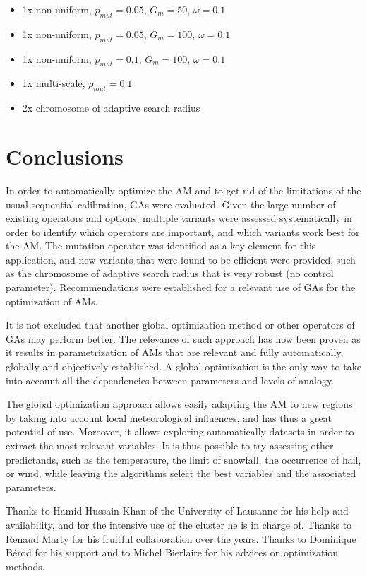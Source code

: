 \documentclass[twocol]{ametsoc}
\begin{document}
\begin{itemize}
	\setlength\itemsep{-4px}
	\item 1x non-uniform, $p_{mut}=0.05$, $G_{m}=50$, $\omega=0.1$
	\item 1x non-uniform, $p_{mut}=0.05$, $G_{m}=100$, $\omega=0.1$
	\item 1x non-uniform, $p_{mut}=0.1$, $G_{m}=100$, $\omega=0.1$
	\item 1x multi-scale,  $p_{mut}=0.1$
	\item 2x chromosome of adaptive search radius
\end{itemize}


\section{Conclusions}

In order to automatically optimize the AM and to get rid of the limitations of the usual sequential calibration, GAs were evaluated. Given the large number of existing operators and options, multiple variants were assessed systematically in order to identify which operators are important, and which variants work best for the AM. The mutation operator was identified as a key element for this application, and new variants that were found to be efficient were provided, such as the chromosome of adaptive search radius that is very robust (no control parameter). Recommendations were established for a relevant use of GAs for the optimization of AMs. 

It is not excluded that another global optimization method or other operators of GAs may perform better. The relevance of such approach has now been proven as it results in parametrization of AMs that are relevant and fully automatically, globally and objectively established. A global optimization is the only way to take into account all the dependencies between parameters and levels of analogy.

The global optimization approach allows easily adapting the AM to new regions by taking into account local meteorological influences, and has thus a great potential of use. Moreover, it allows exploring automatically datasets in order to extract the most relevant variables. It is thus possible to try assessing other predictands, such as the temperature, the limit of snowfall, the occurrence of hail, or wind, while leaving the algorithms select the best variables and the associated parameters.


%
\acknowledgments
Thanks to Hamid Hussain-Khan of the University of Lausanne for his help and availability, and for the intensive use of the cluster he is in charge of. Thanks to Renaud Marty for his fruitful collaboration over the years. Thanks to Dominique B\'{e}rod for his support and to Michel Bierlaire for his advices on optimization methods.
\end{document}
